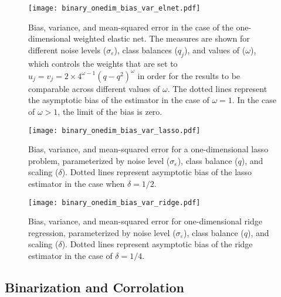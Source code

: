 \begin{figure}[htpb]
  \centering
  \texttt{[image: binary\_onedim\_bias\_var\_elnet.pdf]}
  \caption{%
    Bias, variance, and mean-squared error in the case of the one-dimensional weighted elastic
    net. The measures are shown for different noise levels (\(\sigma_\varepsilon\)), class
    balances (\(q_j\)), and values of (\(\omega\)), which controls the weights that are set to
    \(u_j = v_j = 2\times 4^{\omega - 1}(q-q^2)^\omega\) in order for the results to be
    comparable across different values of \(\omega\). The dotted lines represent the asymptotic
    bias of the estimator in the case of \(\omega = 1\). In the case of \(\omega > 1\), the
    limit of the bias is zero.
  }
  \label{fig:binary-onedim-bias-var-elnet}
\end{figure}

\begin{figure}[htpb]
  \centering
  \texttt{[image: binary\_onedim\_bias\_var\_lasso.pdf]}
  \caption{%
    Bias, variance, and mean-squared error for a one-dimensional lasso problem,
    parameterized by noise level (\(\sigma_\varepsilon\)), class balance (\(q\)), and
    scaling (\(\delta\)). Dotted lines represent asymptotic bias of the lasso
    estimator in the case when \(\delta = 1/2\).}
  \label{fig:bias-var-onedim-lasso-full}
\end{figure}

\begin{figure}[htpb]
  \centering
  \texttt{[image: binary\_onedim\_bias\_var\_ridge.pdf]}
  \caption{%
    Bias, variance, and mean-squared error for one-dimensional ridge regression,
    parameterized by noise level (\(\sigma_\varepsilon\)), class balance (\(q\)), and
    scaling (\(\delta\)). Dotted lines represent asymptotic bias of the ridge
    estimator in the case of \(\delta = 1/4\).}
  \label{fig:bias-var-onedim-ridge-full}
\end{figure}

\subsection{Binarization and Corrolation}

